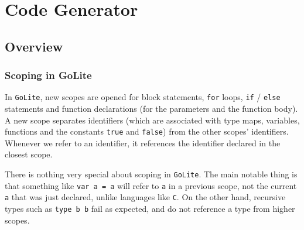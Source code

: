\documentclass[11pt]{article}
\begin{document}
\section{Code Generator}
\subsection{Overview}
\subsubsection{Scoping in GoLite}
In \texttt{GoLite}, new scopes are opened for block statements,
\texttt{for} loops, \texttt{if} / \texttt{else} statements and
function declarations (for the parameters and the function body). A
new scope separates identifiers (which are associated with type maps,
variables, functions and the constants \texttt{true} and
\texttt{false}) from the other scopes' identifiers. Whenever we refer
to an identifier, it references the identifier declared in the closest
scope.

There is nothing very special about scoping in \texttt{GoLite}. The
main notable thing is that something like \texttt{var a = a} will
refer to \texttt{a} in a previous scope, not the current \texttt{a}
that was just declared, unlike languages like \texttt{C}.  On the
other hand, recursive types such as \texttt{type b b} fail as
expected, and do not reference a type from higher scopes.
\end{document}
